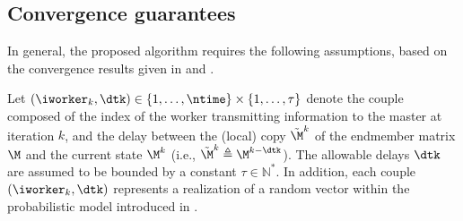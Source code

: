 \documentclass[journal,final,letterpaper,twoside,twocolumn]{IEEEtran}
\begin{document}


    \subsection{Convergence guarantees} \label{subsec:convergence}

In general, the proposed algorithm requires the following assumptions, based on the convergence results given in \cite[Theorem 1]{Bolte2013} and \cite[Theorem 1]{Cannelli2016}.

\begin{assumption} \label{alg_assumption}
    Let $(\iworker_k,\dtk) \in \{1,\dotsc,\ntime \}\times \{1,\dotsc,\tau \}$ denote the couple composed of the index of the worker transmitting information to the master at iteration $k$, and the delay between the (local) copy $\tilde{\M}^k$ of the endmember matrix $\M$ and the current state $\M^k$ (i.e., $\tilde{\M}^k \triangleq \M^{k - \dtk}$). The allowable delays $\dtk$ are assumed to be bounded by a constant $\tau \in \mathbb{N}^*$. In addition, each couple $(\iworker_k,\dtk)$ represents a realization of a random vector within the probabilistic model introduced in \cite[Assumption C]{Cannelli2016}.
\end{assumption}
\end{document}
